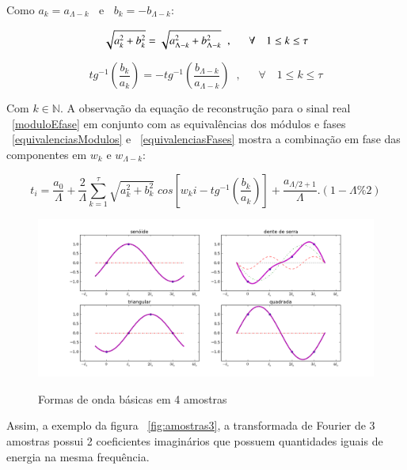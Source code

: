 Como $a_k = a_{\Lambda -k}\;\;$ e $\;\;b_k = - b_{\Lambda -k}$:

\begin{equation}\label{equivalenciasModulos}
\sqrt{a_k^2 + b_k^2} = \sqrt{a_{\Lambda - k}^2 + b_{\Lambda -k}^2} \;\;, \quad \;\; \forall \quad 1 \leq k \leq \tau  \\
\end{equation}

\begin{equation}\label{equivalenciasFases}
tg^{-1}\left(\frac{b_k}{a_k}\right)=-tg^{-1}\left(\frac{b_{\Lambda -k}}{a_{\Lambda - k}}\right)\;\;,\quad \;\; \forall \quad 1 \leq k \leq \tau
\end{equation}


Com $k \in \mathbb{N}$. A observação da equação de reconstrução para o sinal real ~\ref{moduloEfase} em conjunto com as equivalências dos módulos e fases ~\ref{equivalenciasModulos} e ~\ref{equivalenciasFases}
mostra a combinação em fase das componentes em $w_k$ e $w_{\Lambda-k}$:

\begin{equation}
t_i = \frac{a_0}{\Lambda} + \frac{2}{\Lambda}\sum_{k=1}^{\tau}\sqrt{a_k^2 + b_k^2} \; cos\left[w_k i - tg^{-1}\left(\frac{b_k}{a_k}\right)\right]+ \frac{ a_{\Lambda/2+1}}{\Lambda}.(1-\Lambda\% 2)
\end{equation}

\begin{figure}[h!]
    \centering
    \caption{Formas de onda básicas em 4 amostras}
        \includegraphics[width=\textwidth]{figuras/amostras4formas__}
        \label{fig:formas4}
\end{figure}


Assim, a exemplo da figura ~\ref{fig:amostras3}, a transformada de Fourier de 3 amostras possui 2 coeficientes imaginários que possuem quantidades iguais de energia na mesma frequência.

